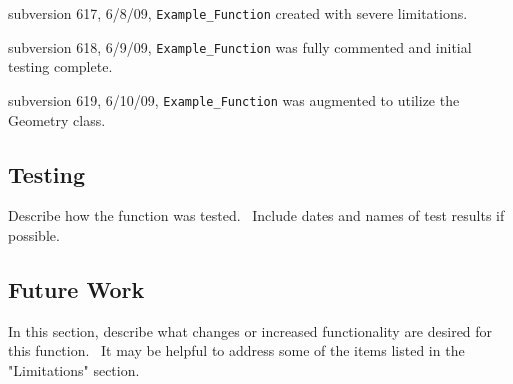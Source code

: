 subversion 617, 6/8/09, \texttt{Example\_Function} created with severe
limitations.

subversion 618, 6/9/09, \texttt{Example\_Function} was fully commented and
initial testing complete.

subversion 619, 6/10/09, \texttt{Example\_Function} was augmented to utilize
the Geometry class.

\subsection*{Testing}

Describe how the function was tested. \ Include dates and names of test
results if possible.

\subsection*{Future Work}

In this section, describe what changes or increased functionality are
desired for this function. \ It may be helpful to address some of the items
listed in the "Limitations" section.
